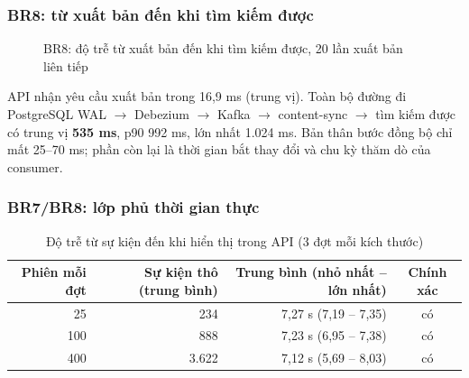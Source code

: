 \subsubsection{BR8: từ xuất bản đến khi tìm kiếm được}

\begin{figure}[H]
\centering
{}
\caption{BR8: độ trễ từ xuất bản đến khi tìm kiếm được, 20 lần xuất bản liên tiếp}
\label{fig:sync-latency}
\end{figure}

API nhận yêu cầu xuất bản trong 16,9 ms (trung vị). Toàn bộ đường đi PostgreSQL WAL $\rightarrow$ Debezium $\rightarrow$ Kafka $\rightarrow$ content-sync $\rightarrow$ tìm kiếm được có trung vị \textbf{535 ms}, p90 992 ms, lớn nhất 1.024 ms. Bản thân bước đồng bộ chỉ mất 25--70 ms; phần còn lại là thời gian bắt thay đổi và chu kỳ thăm dò của consumer.

\subsubsection{BR7/BR8: lớp phủ thời gian thực}

\begin{table}[H]
\centering\small
\caption{Độ trễ từ sự kiện đến khi hiển thị trong API (3 đợt mỗi kích thước)}\label{tab:live}
\begin{tabular}{@{}rrrc@{}}
\toprule
\textbf{Phiên mỗi đợt} & \textbf{Sự kiện thô (trung bình)} & \textbf{Trung bình (nhỏ nhất -- lớn nhất)} & \textbf{Chính xác} \\
\midrule
25 & 234 & 7,27 s (7,19 -- 7,35) & có \\
100 & 888 & 7,23 s (6,95 -- 7,38) & có \\
400 & 3.622 & 7,12 s (5,69 -- 8,03) & có \\
\bottomrule
\end{tabular}
\end{table}

